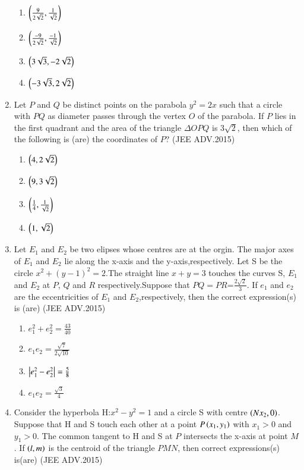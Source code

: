 \documentclass[journal,12pt,twocolumn]{IEEEtran}
\theoremstyle{remark}
\begin{document}
\begin{enumerate}
		\begin{enumerate}
			\item $\left(\frac{9}{2\sqrt{2}},\frac{1}{\sqrt{2}}\right)$ 
			\item $ \left(\frac{-9}{2\sqrt{2}},\frac{-1}{\sqrt{2}}\right)$
			\item $\left(3\sqrt{3},-2\sqrt{2}\right)$
			\item $ \left(-3\sqrt{3},2\sqrt{2}\right)$
		
		\end{enumerate}

	\item Let $P$ and $Q$ be distinct points on the parabola $y^2=2x$ such 
		that a circle with $PQ$ as diameter passes through the vertex
		$O$ of the parabola. If $P$ lies in the first quadrant and the area
		of the triangle  \(\Delta \)$OPQ$ is 3$\sqrt{2}$, then which of the following is
		(are) the coordinates of $P$? 
		\hfill(JEE ADV.2015)
		
		\begin{enumerate}
			\item $ \left(4,2\sqrt{2}\right)$
			\item $\left(9,3\sqrt{2}\right)$
			\item $ \left(\frac{1}{4},\frac{1}{\sqrt{2}}\right)$
			\item  $ \left(1,\sqrt{2}\right)$
		\end{enumerate}
	\item Let $ E_1$  and $ E_2$ be two elipses whose centres are at the orgin.
              The major axes of $E_1$ and $ E_2$ lie along the x-axis and the
              y-axis,respectively. Let S be the circle $x^2+(y-1)^2=2$.The
		straight line $x+y=3$ touches the curves S, $E_1$ and $E_2$ at $P$, $Q$
		and $R$ respectively.Suppose that $PQ=PR$=$\frac{2\sqrt{2}}{3}$. If $e_1$ and
              $e_2$ are the eccentricities of $E_1$ and $E_2$,respectively, then the 
              correct expression(s) is (are) 
		\hfill(JEE ADV.2015)
		
		\begin{enumerate}
			\item $e_1^2+e_2^2=\frac{43}{40}$
			\item $e_1e_2=\frac{\sqrt{7}}{2\sqrt{10}}$
			\item $\left\vert e_1^2-e_2^2\right\vert=\frac{5}{8}$
			\item $e_1e_2=\frac{\sqrt{3}}{4}$ 
		\end{enumerate}
	\item Consider the hyperbola H:$x^2-y^2=1$ and a circle S with 
		centre $\left(Nx_2,0\right)$. Suppose that H and S touch each other at a 
	      point $P\left(x_1,y_1\right)$ with $x_1>0$ and $y_1>0$. The common tangent to H and S at $P$ intersects the x-axis at point $M$. If $\left(l,m\right)$ is the centroid of the triangle $PMN$, then correct expressions(s) is(are) 
	      \hfill(JEE ADV.2015)
	      

\end{enumerate}
\end{document}
